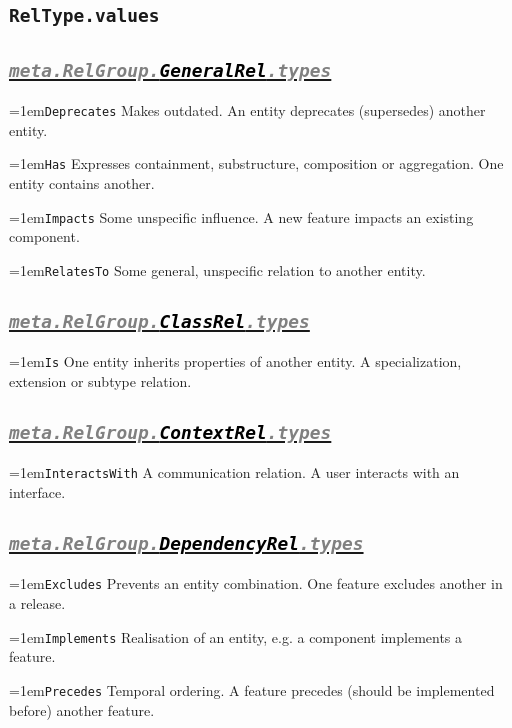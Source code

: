 \documentclass[a4paper,oneside]{article}
\newcommand\Concept[2]{\hangindent=1em\lstinline+#1+ #2}
\begin{document}
\begin{multicols}{2}
\raggedright

\section*{\texttt{RelType.values}}

\subsection*{\underline{\texttt{\textit{{\textcolor{gray}{meta.RelGroup.}\textcolor{black}{GeneralRel}}\textcolor{gray}{.types}}}}}
\Concept{Deprecates}{Makes outdated. An entity deprecates (supersedes) another entity.}

\Concept{Has}{Expresses containment, substructure, composition or aggregation. One entity contains another.}

\Concept{Impacts}{Some unspecific influence. A new feature impacts an existing component.}

\Concept{RelatesTo}{Some general, unspecific relation to another entity.}


\subsection*{\underline{\texttt{\textit{{\textcolor{gray}{meta.RelGroup.}\textcolor{black}{ClassRel}}\textcolor{gray}{.types}}}}}
\Concept{Is}{One entity inherits properties of another entity. A specialization, extension or subtype relation. }


\subsection*{\underline{\texttt{\textit{{\textcolor{gray}{meta.RelGroup.}\textcolor{black}{ContextRel}}\textcolor{gray}{.types}}}}}
\Concept{InteractsWith}{A communication relation. A user interacts with an interface.}


\subsection*{\underline{\texttt{\textit{{\textcolor{gray}{meta.RelGroup.}\textcolor{black}{DependencyRel}}\textcolor{gray}{.types}}}}}
\Concept{Excludes}{Prevents an entity combination. One feature excludes another in a release.}

\Concept{Implements}{Realisation of an entity, e.g. a component implements a feature.}

\Concept{Precedes}{Temporal ordering. A feature precedes (should be implemented before) another feature.}


\end{multicols}
\end{document}
